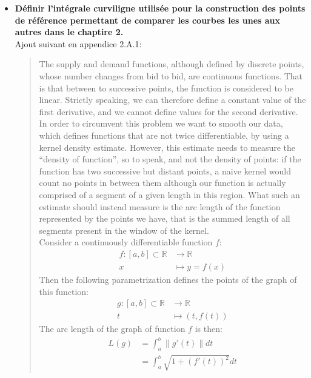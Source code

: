 \documentclass{article}
\begin{document}
\begin{itemize}
\item \textbf{Définir l'intégrale curviligne utilisée pour la construction des points de référence permettant de comparer les courbes les unes aux autres dans le chaptire 2.}\\

Ajout suivant en appendice 2.A.1:

\begin{quote}
The supply and demand functions, although defined by discrete points, whose number changes from bid to bid, are continuous functions. That is that between to successive points, the function is considered to be linear. Strictly speaking, we can therefore define a constant value of the first derivative, and we cannot define values for the second derivative. In order to circumvent this problem we want to smooth our data, which defines functions that are not twice differentiable, by using a kernel density estimate. However, this estimate needs to measure the ``density of function'', so to speak, and not the density of points: if the function has two successive but distant points, a naive kernel would count no points in between them although our function is actually comprised of a segment of a given length in this region. What such an estimate should instead measure is the arc length of the function represented by the points we have, that is the summed length of all segments present in the window of the kernel.\\

Consider a continuously differentiable function $f$:
\begin{align*}
f \colon [a,b] \subset \mathbb{R} &\to \mathbb{R}\\
x & \mapsto y=f(x)
\end{align*}
Then the following parametrization defines the points of the graph of this function: 
\begin{align*}
g \colon [a,b] \subset \mathbb{R} &\to \mathbb{R}\\
t & \mapsto (t, f(t))
\end{align*}
The arc length of the graph of function $f$ is then:
\begin{align*}
L(g) &= \int_a^b\lVert g'(t)\rVert dt \\
& =\int_a^b \sqrt{1+\left(f'(t)\right)^2} dt
\end{align*}
\end{quote}
\end{itemize}
\end{document}
